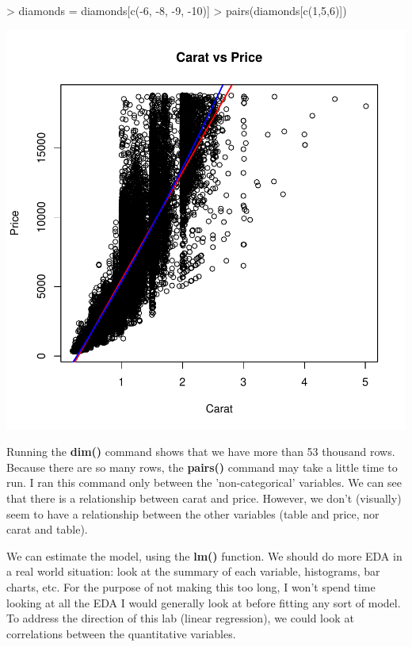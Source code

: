 \documentclass{article}
\begin{document}
\begin{Schunk}
\begin{Sinput}
> diamonds = diamonds[c(-6, -8, -9, -10)]
> pairs(diamonds[c(1,5,6)])
\end{Sinput}
\end{Schunk}
\includegraphics{Lab2-chunk}

Running the \textbf{dim()} command shows that we have more than 53 thousand rows.  Because there are so many rows, the \textbf{pairs()} command may take a little time to run.  I ran this command only between the 'non-categorical' variables. We can see that there is a relationship between carat and price.  However, we don't (visually) seem to have a relationship between the other variables (table and price, nor carat and table).  

We can estimate the model, using the \textbf{lm()} function.  We should do more EDA in a real world situation: look at the summary of each variable, histograms, bar charts, etc. For the purpose of not making this too long, I won't spend time looking at all the EDA I would generally look at before fitting any sort of model.  To address the direction of this lab (linear regression), we could look at correlations between the quantitative variables.
\end{document}
